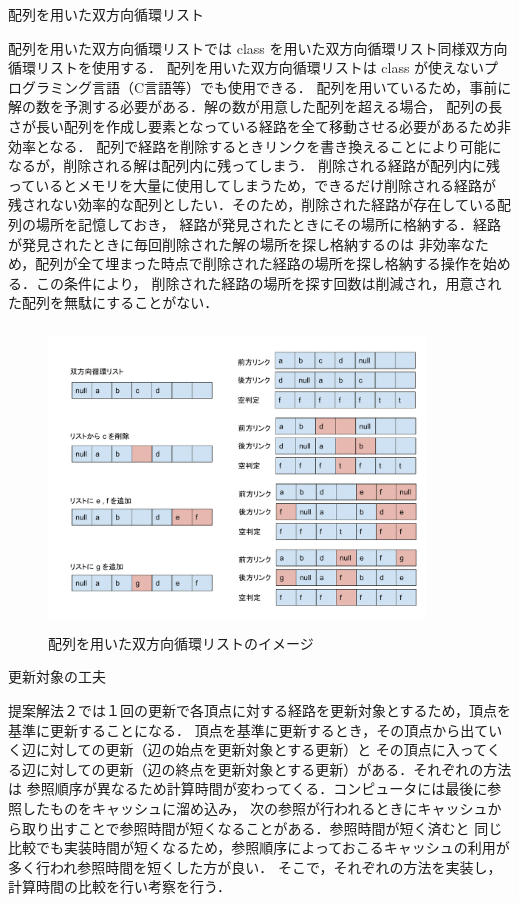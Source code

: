 \documentclass[12pt]{optlab-bachelor}
\begin{document}
\begin{description}
  \item[配列を用いた双方向循環リスト]
\end{description}

配列を用いた双方向循環リストでは class を用いた双方向循環リスト同様双方向循環リストを使用する．
配列を用いた双方向循環リストは class が使えないプログラミング言語（C言語等）でも使用できる．
配列を用いているため，事前に解の数を予測する必要がある．解の数が用意した配列を超える場合，
配列の長さが長い配列を作成し要素となっている経路を全て移動させる必要があるため非効率となる．
配列で経路を削除するときリンクを書き換えることにより可能になるが，削除される解は配列内に残ってしまう．
削除される経路が配列内に残っているとメモリを大量に使用してしまうため，できるだけ削除される経路が
残されない効率的な配列としたい．そのため，削除された経路が存在している配列の場所を記憶しておき，
経路が発見されたときにその場所に格納する．経路が発見されたときに毎回削除された解の場所を探し格納するのは
非効率なため，配列が全て埋まった時点で削除された経路の場所を探し格納する操作を始める．この条件により，
削除された経路の場所を探す回数は削減され，用意された配列を無駄にすることがない．

\begin{figure}[htbp]
  \centering
  \caption{配列を用いた双方向循環リストのイメージ}
  \includegraphics[height=8.0cm, width=10.0cm]{fig/fig11.pdf}
\end{figure}

\begin{description}
  \item[更新対象の工夫]
\end{description}

提案解法２では１回の更新で各頂点に対する経路を更新対象とするため，頂点を基準に更新することになる．
頂点を基準に更新するとき，その頂点から出ていく辺に対しての更新（辺の始点を更新対象とする更新）と
その頂点に入ってくる辺に対しての更新（辺の終点を更新対象とする更新）がある．それぞれの方法は
参照順序が異なるため計算時間が変わってくる．コンピュータには最後に参照したものをキャッシュに溜め込み，
次の参照が行われるときにキャッシュから取り出すことで参照時間が短くなることがある．参照時間が短く済むと
同じ比較でも実装時間が短くなるため，参照順序によっておこるキャッシュの利用が多く行われ参照時間を短くした方が良い．
そこで，それぞれの方法を実装し，計算時間の比較を行い考察を行う．
\end{document}
